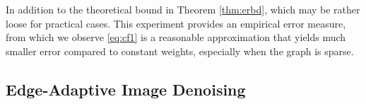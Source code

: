 \documentclass{article}
\begin{document}
In addition to the theoretical bound in Theorem \ref{thm:erbd}, which may be rather loose for practical cases. This experiment provides an empirical error measure, from which we observe \eqref{eq:cf1} is a reasonable approximation that yields much smaller error compared to constant weights, especially when the graph is sparse. 

\subsection{Edge-Adaptive Image Denoising}


\end{document}
